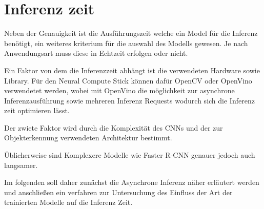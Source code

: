 






\section{Inferenz zeit}

Neben der Genauigkeit ist die Ausführungszeit welche ein Model für die 
Inferenz benötigt, ein weiteres kriterium für die auswahl des Modells gewesen.
Je nach Anwendungsart muss diese in Echtzeit erfolgen oder nicht.

Ein Faktor von dem die Inferenzzeit abhängt ist die verwendeten Hardware
sowie Library. Für den Neural Compute Stick können dafür OpenCV oder 
OpenVino verwendetet werden, wobei mit OpenVino die möglichkeit 
zur asynchrone Inferenzausführung sowie mehreren Inferenz Requests wodurch 
sich die Inferenz zeit optimieren lässt.


Der zwiete Faktor wird durch die Komplexität des CNNs und der
zur Objekterkennung verwendeten Architektur bestimmt.

Üblicherweise sind Komplexere Modelle wie Faster R-CNN genauer jedoch 
auch langsamer.

Im folgenden soll daher zunächst die Asynchrone Inferenz näher 
erläutert werden und anschließen ein verfahren zur Untersuchung 
des Einfluss der Art der trainierten Modelle auf die Inferenz Zeit.

